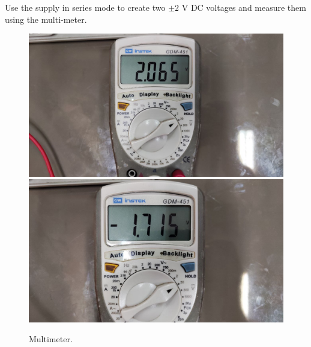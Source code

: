 \documentclass[11pt]{article}
\begin{document}
\begin{question}
\begin{subquestion}{Use the supply in series mode to create two $\pm 2$ V DC voltages and measure them using the multi-meter.}
{            \begin{figure}[H]
                \begin{center}
                    \includegraphics[scale=0.1]{Fig/44.jpeg}
                    \includegraphics[scale=0.1]{Fig/45.jpeg}
                    \caption{Multimeter.}
                \end{center}
            \end{figure}
        }
    \end{subquestion}


\end{question}
\end{document}
